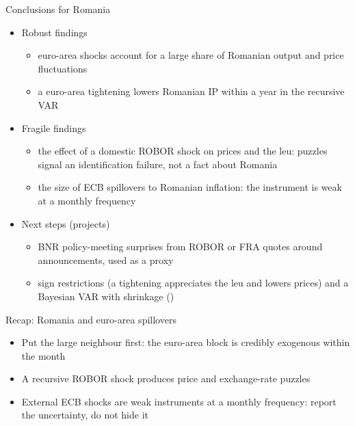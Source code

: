 \begin{frame}{Conclusions for Romania}
\itemsize{\small}
\begin{itemize}
    \item Robust findings
    \begin{itemize}
        \item euro-area shocks account for a large share of Romanian output and price fluctuations
        \item a euro-area tightening lowers Romanian IP within a year in the recursive VAR
    \end{itemize}
    \item Fragile findings
    \begin{itemize}
        \item the effect of a domestic ROBOR shock on prices and the leu: puzzles signal an identification failure, not a fact about Romania
        \item the size of ECB spillovers to Romanian inflation: the instrument is weak at a monthly frequency
    \end{itemize}
    \item Next steps (projects)
    \begin{itemize}
        \item BNR policy-meeting surprises from ROBOR or FRA quotes around announcements, used as a proxy
        \item sign restrictions (a tightening appreciates the leu and lowers prices) and a Bayesian VAR with shrinkage ()
    \end{itemize}
\end{itemize}
\end{frame}

\begin{frame}{Recap: Romania and euro-area spillovers}
\itemsize{\small}
\begin{itemize}
    \item Put the large neighbour first: the euro-area block is credibly exogenous within the month
    \item A recursive ROBOR shock produces price and exchange-rate puzzles
    \item External ECB shocks are weak instruments at a monthly frequency: report the uncertainty, do not hide it
\end{itemize}
\end{frame}


